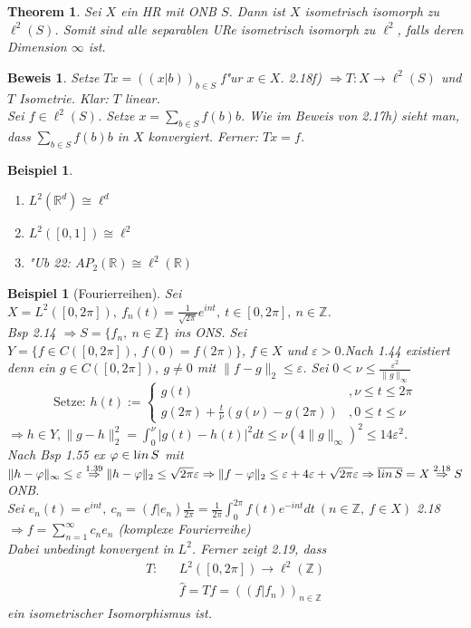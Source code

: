\documentclass[a4paper,11pt]{book}
\newcommand{\R}{{\mathbb R}}
\newcommand{\Z}{{\mathbb Z}}
\newcommand{\eps}{{\varepsilon}}
\newcommand{\lin}{\ensuremath{\text lin}\,} %
\newtheorem{Theo}[Def]{Theorem}
\newtheorem*{BspNO}{Beispiel}
\newtheorem{Bsp}[Def]{Beispiel}
\theoremstyle{nonumberplain}
\newtheorem{Bew}{Beweis}
\begin{document}
\begin{Theo}
Sei $X$ ein HR mit ONB $S$. Dann ist $X$ isometrisch isomorph zu $\ell^2(S)$. Somit sind alle separablen URe isometrisch isomorph zu $\ell^2$, falls deren Dimension $\infty$ ist.
\end{Theo}


\begin{Bew}
Setze $Tx = \left( (x|b) \right)_{b \in S}$ f"ur $x \in X$. 2.18f) $\Rightarrow T: X \rightarrow \ell^2(S)$ und $T$ Isometrie. Klar: $T$ linear.\\
Sei $f \in \ell^2(S)$. Setze $x = \sum_{b \in S} f(b)b$. Wie im Beweis von 2.17h) sieht man, dass $\sum_{b \in S} f(b)b$ in $X$ konvergiert. Ferner: $Tx = f$.
\end{Bew}


\begin{BspNO}
\begin{enumerate}
\item $L^2(\R^d) \cong \ell^d$

\item $L^2([0,1]) \cong \ell^2$

\item "Ub 22: $AP_2(\R) \cong \ell^2(\R)$
\end{enumerate}
\end{BspNO}



\begin{Bsp}[Fourierreihen]
Sei $X = L^2([0,2\pi]),\ f_n(t) = \frac1{\sqrt{2\pi}}e^{int},\ t \in [0,2\pi],\ n \in \Z$.\\
Bsp 2.14 $\Rightarrow S = \{f_n,\ n \in \Z\}$ ins ONS. Sei $Y = \{ f \in C([0,2\pi]),\ f(0) = f(2\pi)\}$, $f \in X$ und $\eps > 0$.Nach 1.44 existiert denn ein $g \in C([0,2\pi]),\ g \not= 0$ mit $\|f-g\|_2 \leq \eps$. Sei $0 < \nu \leq \frac{\eps^2}{\|g\|_{\infty}}$
\[
\text{Setze: } h(t) := \begin{cases}
g(t) &, \nu \leq t \leq 2\pi \\
g(2\pi) + \frac{t}{\nu}(g(\nu)-g(2\pi)) &, 0 \leq t \leq \nu
\end{cases}
\]
$\Rightarrow h \in Y, \|g-h\|_2^2 = \int_0^{\nu} |g(t)-h(t)|^2 dt \leq \nu (4 \|g\|_{\infty})^2 \leq 14 \eps^2$.\\
Nach Bsp 1.55 ex $\varphi \in \lin S$ mit $\|h-\varphi\|_{\infty} \leq \eps \stackrel{1.39}{\Rightarrow} \|h-\varphi\|_2 \leq \sqrt{2\pi} \eps \Rightarrow \|f-\varphi\|_2 \leq \eps + 4 \eps + \sqrt{2\pi} \eps \Rightarrow \overline{\lin S} = X \stackrel{2.18}{\Rightarrow} S$ ONB.\\
Sei $e_n(t) = e^{int},\ c_n = (f|e_n) \frac1{2\pi} = \frac1{2\pi} \int_0^{2\pi} f(t) e^{-int} dt \ (n \in \Z,\ f \in X)$ 2.18 $\Rightarrow f = \sum_{n=1}^{\infty} c_n e_n$ (komplexe Fourierreihe)\\
Dabei unbedingt konvergent in $L^2$. Ferner zeigt 2.19, dass
\begin{eqnarray*}
T: & & L^2([0,2\pi]) \rightarrow \ell^2(\Z) \\
& & \hat{f} = Tf = \left( (f|f_n) \right)_{n \in \Z}
\end{eqnarray*}
ein isometrischer Isomorphismus ist.
\end{Bsp}
\end{document}
